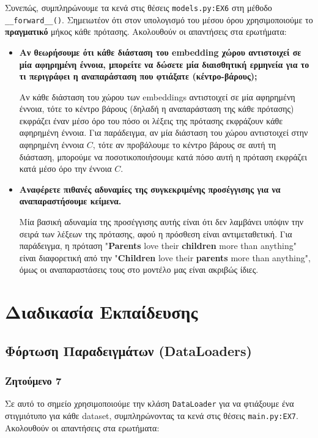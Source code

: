 \documentclass[a4paper, 12pt]{article}
\begin{document}
            Συνεπώς, συμπληρώνουμε τα κενά στις θέσεις \verb|models.py:EX6| στη μέθοδο \verb|__forward__()|. Σημειωτέον ότι στον υπολογισμό του μέσου όρου χρησιμοποιούμε το \textbf{πραγματικό} μήκος κάθε πρότασης. Ακολουθούν οι απαντήσεις στα ερωτήματα:
            
            \begin{itemize}
                \item \textbf{Αν θεωρήσουμε ότι κάθε διάσταση του embedding χώρου αντιστοιχεί σε μία αφηρημένη έννοια, μπορείτε να δώσετε μία διαισθητική ερμηνεία για το τι περιγράφει η αναπαράσταση που φτιάξατε (κέντρο-βάρους);}
                    
                    Αν κάθε διάσταση του χώρου των embeddings αντιστοιχεί σε μία αφηρημένη έννοια, τότε το κέντρο βάρους (δηλαδή η αναπαράσταση της κάθε πρότασης) εκφράζει έναν μέσο όρο του πόσο οι λέξεις της πρότασης εκφράζουν κάθε αφηρημένη έννοια. Για παράδειγμα, αν μία διάσταση του χώρου αντιστοιχεί στην αφηρημένη έννοια $C$, τότε αν προβάλουμε το κέντρο βάρους σε αυτή τη διάσταση, μπορούμε να ποσοτικοποιήσουμε κατά πόσο αυτή η πρόταση εκφράζει κατά μέσο όρο την έννοια $C$. 
                    
                \item \textbf{Αναφέρετε πιθανές αδυναμίες της συγκεκριμένης προσέγγισης για να αναπαραστήσουμε κείμενα.}
                
                    Μία βασική αδυναμία της προσέγγισης αυτής είναι ότι δεν λαμβάνει υπόψιν την σειρά των λέξεων της πρότασης, αφού η πρόσθεση είναι αντιμεταθετική. Για παράδειγμα, η πρόταση "\textbf{Parents} love their \textbf{children} more than anything" είναι διαφορετική από την "\textbf{Children} love their \textbf{parents} more than anything", όμως οι αναπαραστάσεις τους στο μοντέλο μας είναι ακριβώς ίδιες.
                    
            \end{itemize}
            
\section{Διαδικασία Εκπαίδευσης}

    \subsection{Φόρτωση Παραδειγμάτων (DataLoaders)}
        \subsubsection*{Ζητούμενο 7}
            Σε αυτό το σημείο χρησιμοποιούμε την κλάση \verb|DataLoader| για να φτιάξουμε ένα στιγμιότυπο για κάθε dataset, συμπληρώνοντας τα κενά στις θέσεις \verb|main.py:EX7|. Ακολουθούν οι απαντήσεις στα ερωτήματα:
            
\end{document}
